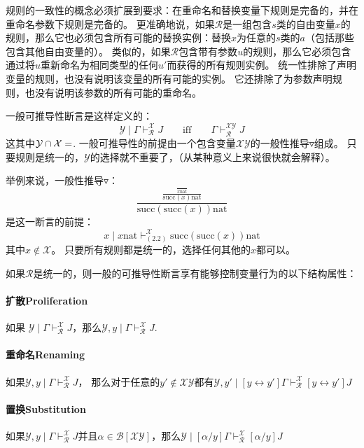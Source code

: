 规则的一致性的概念必须扩展到要求：在重命名和替换变量下规则是完备的，并在重命名参数下规则是完备的。
更准确地说，如果$ \mathcal{R} $是一组包含$ s $类的自由变量$ x $的规则，那么它也必须包含所有可能的替换实例：替换$ x $为任意的$ s $类的$ a $（包括那些包含其他自由变量的）。
类似的，如果$ \mathcal{R} $包含带有参数$ u $的规则，那么它必须包含通过将$ u $重新命名为相同类型的任何$ u'$而获得的所有规则实例。
统一性排除了声明变量的规则，也没有说明该变量的所有可能的实例。
它还排除了为参数声明规则，也没有说明该参数的所有可能的重命名。

一般可推导性断言是这样定义的：
$$\mathcal{Y} \mid \Gamma \vdash_{\mathcal{R}}^{\mathcal{X}} J \qquad \text{iff} \qquad \Gamma \vdash_{\mathcal{R}}^{\mathcal{XY}}  J$$
这其中$\mathcal{Y} \cap \mathcal{X}=\empty$. 
一般可推导性的前提由一个包含变量$ \mathcal{XY} $的一般性推导$ \triangledown $组成。
只要规则是统一的，$ \mathcal{Y} $的选择就不重要了，（从某种意义上来说很快就会解释）。

举例来说，一般性推导$\triangledown$：
$$\frac{\frac{\frac{}{x \text{nat}}}{\text{succ} (x) \text{nat}}} {\text{succ} (\text{succ} (x)) \text{nat}}$$
是这一断言的前提：
$$x \mid x \text{nat} \vdash_{(2.2)}^{\mathcal{X}} \text{succ} (\text{succ} (x)) \text{nat}$$
其中$x \notin \mathcal{X}$。
只要所有规则都是统一的，选择任何其他的$ x $都可以。

如果$ \mathcal{R} $是统一的，则一般的可推导性断言享有能够控制变量行为的以下结构属性：

\paragraph{扩散Proliferation} 
如果 $\mathcal{Y} \mid \Gamma \vdash_{\mathcal{R}}^{\mathcal{X}} J$，那么$\mathcal{Y}, y \mid \Gamma \vdash_{\mathcal{R}}^{\mathcal{X}} J$.

\paragraph{重命名Renaming} 
如果$\mathcal{Y}, y \mid \Gamma \vdash_{\mathcal{R}}^{\mathcal{X}} J$，
那么对于任意的$y' \notin \mathcal{XY}$都有$\mathcal{Y},y' \mid [y \leftrightarrow y'] \Gamma \vdash_{\mathcal{R}}^{\mathcal{X}} [y \leftrightarrow y'] J$

\paragraph{置换Substitution} 
如果$\mathcal{Y}, y \mid \Gamma \vdash_{\mathcal{R}}^{\mathcal{X}} J$并且$\alpha \in \mathcal{B}[\mathcal{XY}]$，那么$\mathcal{Y} \mid [\alpha / y] \Gamma \vdash_{\mathcal{R}}^{\mathcal{X}} [\alpha / y] J$

